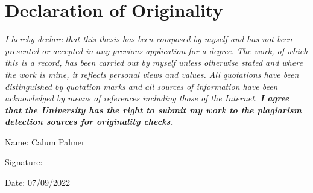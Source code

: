 

\chapter*{Declaration of Originality}\label{ch:declaration of originality}

\emph{I hereby declare that this thesis has been composed by myself and has not been
    presented or accepted in any previous application for a degree. The work, of which
    this is a record, has been carried out by myself unless otherwise stated and where
    the work is mine, it reflects personal views and values. All quotations have been
    distinguished by quotation marks and all sources of information have been
    acknowledged by means of references including those of the Internet.
    \textbf{I agree that the University has the right to submit my work to the plagiarism
    detection sources for originality checks.}}

\vspace{2cm}
        {\noindent\large Name: Calum Palmer}

\vspace{0.5cm}
{\noindent\large Signature: }

\vspace{0.5cm}
{\noindent\large Date: 07/09/2022}

\newpage